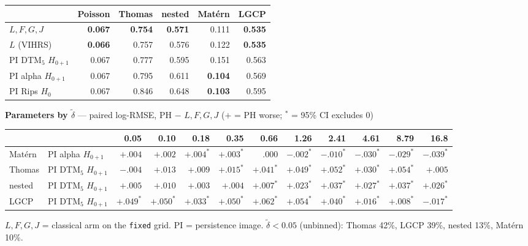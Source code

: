 \documentclass[10pt]{article}
\newcommand{\dt}{\tilde\delta}
\begin{document}
\smallskip
\begin{tabular}{@{}lrrrrr@{}}
\toprule
 & Poisson & Thomas & nested & Mat\'ern & LGCP \\
\midrule
$L,F,G,J$           & \textbf{0.067} & \textbf{0.754} & \textbf{0.571} & 0.111 & \textbf{0.535} \\
$L$ (VIHRS)         & \textbf{0.066} & 0.757 & 0.576 & 0.122 & \textbf{0.535} \\
PI DTM$_5$ $H_{0+1}$ & 0.067 & 0.777 & 0.595 & 0.151 & 0.563 \\
PI alpha $H_{0+1}$  & 0.067 & 0.795 & 0.611 & \textbf{0.104} & 0.569 \\
PI Rips $H_0$       & 0.067 & 0.846 & 0.648 & \textbf{0.103} & 0.595 \\
\bottomrule
\end{tabular}

\bigskip
\textbf{Parameters by $\dt$} --- paired log-RMSE, PH $-$ $L,F,G,J$ ($+$ = PH worse; $^\ast$ = 95\% CI excludes 0)

\smallskip
{\small
\begin{tabular}{@{}l@{\hspace{4pt}}l@{\hspace{4pt}}rrrrrrrrrr@{}}
\toprule
 & & 0.05 & 0.10 & 0.18 & 0.35 & 0.66 & 1.26 & 2.41 & 4.61 & 8.79 & 16.8 \\
\midrule
Mat\'ern & PI alpha $H_{0+1}$ & $+.004$ & $+.002$ & $+.004^\ast$ & $+.003^\ast$ & $.000$ & $-.002^\ast$ & $-.010^\ast$ & $-.030^\ast$ & $-.029^\ast$ & $-.039^\ast$ \\
Thomas   & PI DTM$_5$ $H_{0+1}$ & $-.004$ & $+.013$ & $+.009$ & $+.015^\ast$ & $+.041^\ast$ & $+.049^\ast$ & $+.052^\ast$ & $+.030^\ast$ & $+.054^\ast$ & $+.005$ \\
nested   & PI DTM$_5$ $H_{0+1}$ & $+.005$ & $+.010$ & $+.003$ & $+.004$ & $+.007^\ast$ & $+.023^\ast$ & $+.037^\ast$ & $+.027^\ast$ & $+.037^\ast$ & $+.026^\ast$ \\
LGCP     & PI DTM$_5$ $H_{0+1}$ & $+.049^\ast$ & $+.050^\ast$ & $+.033^\ast$ & $+.050^\ast$ & $+.062^\ast$ & $+.054^\ast$ & $+.040^\ast$ & $+.016^\ast$ & $+.008^\ast$ & $-.017^\ast$ \\
\bottomrule
\end{tabular}
}

\bigskip
\footnotesize $L,F,G,J$ = classical arm on the \texttt{fixed} grid. PI = persistence image. $\dt<0.05$ (unbinned): Thomas 42\%, LGCP 39\%, nested 13\%, Mat\'ern 10\%.
\end{document}
